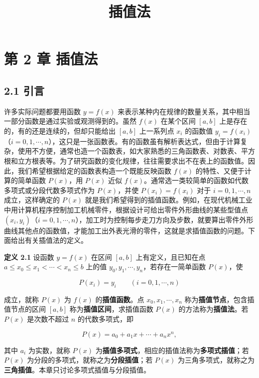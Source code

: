 \documentclass[
  10pt,
  fontset=fandol]{ctexart}
\title{插值法}
\author{}
\date{}
\begin{document}
\maketitle

\section{第 2 章 插值法}\label{ux7b2c-2-ux7ae0-ux63d2ux503cux6cd5}

\subsection{2.1 引言}\label{ux5f15ux8a00}

许多实际问题都要用函数 \(y=f(x)\) 来表示某种内在规律的数量关系，其中相当一部分函数是通过实验或观测得到的。虽然 \(f(x)\) 在某个区间 \([a,b]\) 上是存在的，有的还是连续的，但却只能给出 \([a,b]\) 上一系列点 \(x_i\) 的函数值 \(y_i=f(x_i)\)（\(i=0,1,\cdots,n\)），这只是一张函数表。有的函数虽有解析表达式，但由于计算复杂，使用不方便，通常也造一个函数表，如大家熟悉的三角函数表、对数表、平方根和立方根表等。为了研究函数的变化规律，往往需要求出不在表上的函数值。因此，我们希望根据给定的函数表构造一个既能反映函数 \(f(x)\) 的特性、又便于计算的简单函数 \(P(x)\)，用 \(P(x)\) 近似 \(f(x)\)。通常选一类较简单的函数如代数多项式或分段代数多项式作为 \(P(x)\)，并使 \(P(x_i)=f(x_i)\) 对于 \(i=0,1,\cdots,n\) 成立，这样确定的 \(P(x)\) 就是我们希望得到的插值函数。例如，在现代机械工业中用计算机程序控制加工机械零件，根据设计可给出零件外形曲线的某些型值点 \((x_i,y_i)\)（\(i=0,1,\cdots,n\)），加工时为控制每步走刀方向及步数，就要算出零件外形曲线其他点的函数值，才能加工出外表光滑的零件，这就是求插值函数的问题。下面给出有关插值法的定义。

\textbf{定义 2.1} 设函数 \(y=f(x)\) 在区间 \([a,b]\) 上有定义，且已知在点 \(a\le x_0\le x_1<\cdots<x_n\le b\) 上的值 \(y_0,y_1,\cdots,y_n\)，若存在一简单函数 \(P(x)\)，使

\[
P(x_i)=y_i\qquad (i=0,1,\cdots,n)
\tag{2.1.1}
\]

成立，就称 \(P(x)\) 为 \(f(x)\) 的\textbf{插值函数}。点 \(x_0,x_1,\cdots,x_n\) 称为\textbf{插值节点}，包含插值节点的区间 \([a,b]\) 称为\textbf{插值区间}，求插值函数 \(P(x)\) 的方法称为\textbf{插值法}。若 \(P(x)\) 是次数不超过 \(n\) 的代数多项式，即

\[
P(x)=a_0+a_1x+\cdots+a_nx^n,
\tag{2.1.2}
\]

其中 \(a_i\) 为实数，就称 \(P(x)\) 为\textbf{插值多项式}，相应的插值法称为\textbf{多项式插值}；若 \(P(x)\) 为分段的多项式，就称之为\textbf{分段插值}；若 \(P(x)\) 为三角多项式，就称之为\textbf{三角插值}。本章只讨论多项式插值与分段插值。
\end{document}
